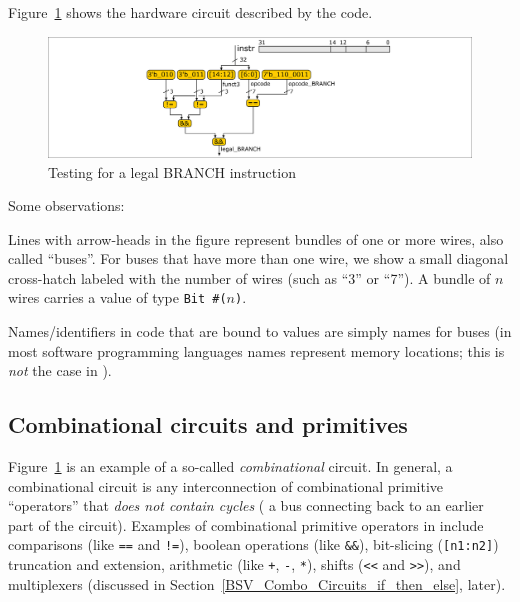 Figure~\ref{Fig_Combo_Is_Legal_BRANCH} shows the hardware circuit described by the code.
\begin{figure}[htbp]
  \centerline{\includegraphics[width=6in,angle=0]{Figures/Fig_Combo_Is_Legal_BRANCH}}
  \caption{\label{Fig_Combo_Is_Legal_BRANCH}Testing for a legal BRANCH instruction}
\end{figure}
Some observations:
\begin{tightlist}

 \item Lines with arrow-heads in the figure represent bundles of one
   or more wires, also called ``buses''.  For buses that have more
   than one wire, we show a small diagonal cross-hatch labeled with
   the number of wires (such as ``3'' or ``7'').  A bundle of $n$
   wires carries a value of type {\tt Bit~\#($n$)}.

 \item Names/identifiers in {\BSV} code that are bound to values are
   simply names for buses (in most software programming languages
   names represent memory locations; this is \emph{not} the case in
   {\BSV}).

\end{tightlist}


\subsection{Combinational circuits and primitives}


Figure~\ref{Fig_Combo_Is_Legal_BRANCH} is an example of a so-called
\emph{combinational} circuit.  In general, a combinational circuit is
any interconnection of combinational primitive ``operators'' that
\emph{does not contain cycles} ({\ie} a bus connecting back to an
earlier part of the circuit).  Examples of combinational primitive
operators in {\BSV} include comparisons (like \verb|==| and \verb|!=|),
boolean operations (like \verb|&&|), bit-slicing (\verb|[n1:n2]|)
truncation and extension, arithmetic (like \verb|+|, \verb|-|,
\verb|*|), shifts (\verb|<<| and \verb|>>|), and multiplexers
(discussed in Section~\ref{BSV_Combo_Circuits_if_then_else}, later).

